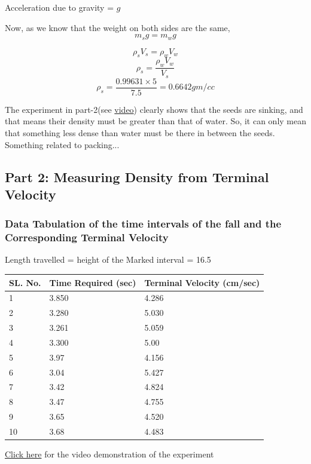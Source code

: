 \documentclass[twocolumn,11pt]{article}
\begin{document}
    Acceleration due to gravity = $g$

    Now, as we know that the weight on both sides are the same,
    \begin{equation}
    \label{Beameq}
        m_sg = m_wg    
    \end{equation}
     
    $$\rho_sV_s = \rho_wV_w$$
    $$\rho_s = \frac{\rho_w V_w}{V_s}$$
    $$\rho_s = \frac{0.99631 \times 5}{7.5} = 0.6642 gm/cc$$

\begin{tcolorbox}[width=8cm,colback={aqua},title={Something looks Fishy!!!},colbacktitle=white,coltitle=black]    
   The experiment in part-2(see \href{https://drive.google.com/file/d/1N1UEq41S4PZ4nuCFbdfE7pa2dK3SC3VD/view?usp=drive_link}{video}) clearly shows that the seeds are sinking, and that means their density must be greater than that of water. So, it can only mean that something less dense than water must be there in between the seeds. Something related to packing...
\end{tcolorbox}

\subsection{Part 2: Measuring Density from Terminal Velocity}
\subsubsection{Data Tabulation of the time intervals of the fall and the Corresponding Terminal Velocity}
Length travelled = height of the Marked interval = 16.5\\
\begin{center}
\begin{tabular}{|p{1cm}||p{3cm}|p{3cm}|} 
 \hline
 SL. No. & Time Required (sec) & Terminal Velocity (cm/sec) \\ [0.5ex] 
 \hline\hline
 1 & 3.850 & 4.286 \\ 
 \hline
 2 & 3.280 & 5.030 \\
 \hline
 3 & 3.261 & 5.059 \\
 \hline
 4 & 3.300 & 5.00 \\
 \hline
 5 & 3.97 & 4.156 \\ 
 \hline
 6 & 3.04 & 5.427\\
 \hline
 7 & 3.42 & 4.824\\
 \hline
 8 & 3.47 & 4.755\\
 \hline
 9 & 3.65 & 4.520\\
 \hline
 10 & 3.68 & 4.483 \\
 \hline
\end{tabular}
\end{center}
 \href{https://drive.google.com/file/d/1N1UEq41S4PZ4nuCFbdfE7pa2dK3SC3VD/view?usp=drive_link}{Click here} for the video demonstration of the experiment
\end{document}
